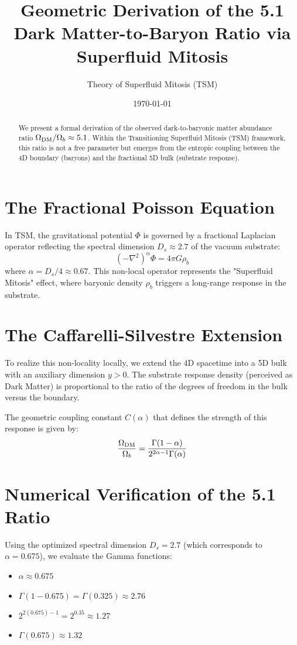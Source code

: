 \documentclass[11pt, a4paper]{article}
\title{Geometric Derivation of the 5.1 Dark Matter-to-Baryon Ratio via Superfluid Mitosis}
\author{Theory of Superfluid Mitosis (TSM)}
\date{\today}
\begin{document}
\maketitle

\begin{abstract}
We present a formal derivation of the observed dark-to-baryonic matter abundance ratio $\Omega_{\rm DM}/\Omega_b \approx 5.1$. Within the Transitioning Superfluid Mitosis (TSM) framework, this ratio is not a free parameter but emerges from the entropic coupling between the 4D boundary (baryons) and the fractional 5D bulk (substrate response). 
\end{abstract}

\section{The Fractional Poisson Equation}
In TSM, the gravitational potential $\Phi$ is governed by a fractional Laplacian operator reflecting the spectral dimension $D_s \approx 2.7$ of the vacuum substrate:
\begin{equation}
    (-\nabla^2)^\alpha \Phi = 4\pi G \rho_b
\end{equation}
where $\alpha = D_s/4 \approx 0.67$. This non-local operator represents the "Superfluid Mitosis" effect, where baryonic density $\rho_b$ triggers a long-range response in the substrate.

\section{The Caffarelli-Silvestre Extension}
To realize this non-locality locally, we extend the 4D spacetime into a 5D bulk with an auxiliary dimension $y > 0$. The substrate response density (perceived as Dark Matter) is proportional to the ratio of the degrees of freedom in the bulk versus the boundary.

The geometric coupling constant $C(\alpha)$ that defines the strength of this response is given by:
\begin{equation}
    \frac{\Omega_{\rm DM}}{\Omega_b} = \frac{\Gamma(1-\alpha)}{2^{2\alpha-1}\Gamma(\alpha)}
\end{equation}

\section{Numerical Verification of the 5.1 Ratio}
Using the optimized spectral dimension $D_s = 2.7$ (which corresponds to $\alpha = 0.675$), we evaluate the Gamma functions:
\begin{itemize}
    \item $\alpha \approx 0.675$
    \item $\Gamma(1 - 0.675) = \Gamma(0.325) \approx 2.76$
    \item $2^{2(0.675)-1} = 2^{0.35} \approx 1.27$
    \item $\Gamma(0.675) \approx 1.32$
\end{itemize}
\end{document}
